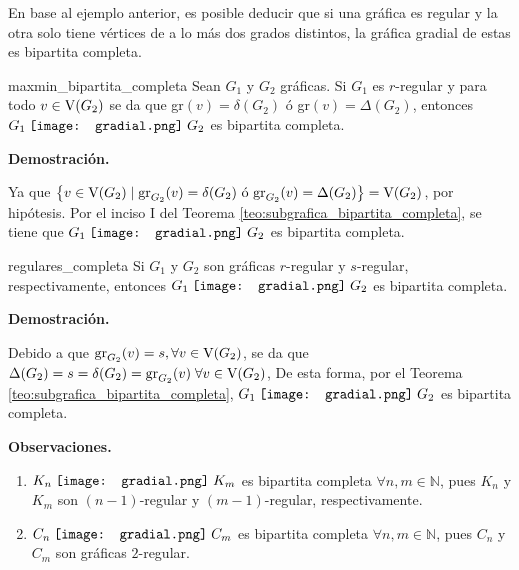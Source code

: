 \documentclass[fleqn, 11pt]{beamer}
\newcommand{\gradial}{\hspace{0.9mm} \texttt{[image: gradial.png]} \hspace{1mm}}
\begin{document}
    En base al ejemplo anterior, es posible deducir que si una gráfica es regular y la otra solo tiene vértices de a lo más dos grados distintos, la gráfica gradial de estas es bipartita completa.

    \begin{corolario}[beforeafter skip = 4mm]{}{maxmin_bipartita_completa}
        Sean $ G_1 $ y $ G_2 $ gráficas. Si $ G_1 $ es $ r $-regular y para todo $ v \in \textnormal{V}(G_2) $ se da que gr$(v) = \delta(G_2) $ ó gr$(v) = \Delta(G_2) $, entonces $ G_1 \gradial G_2 $ es bipartita completa.

        \tcblower

        \textbf{Demostración.} \vspace{3mm}

        Ya que $ \bigl\{ v \in \textnormal{V}(G_2) \mid \textnormal{gr}_{G_2}(v) = \delta(G_2) \textnormal{ ó gr}_{G_2}(v) = \Delta(G_2) \bigr\} = \textnormal{V}(G_2) $, por hipótesis. Por el inciso \textsc{I} del Teorema \eqref{teo:subgrafica_bipartita_completa}, se tiene que $ G_1 \gradial G_2 $ es bipartita completa.
    \end{corolario}

    \begin{corolario}[beforeafter skip = 4mm]{}{regulares_completa}
        Si $ G_1 $ y $ G_2 $ son gráficas $ r $-regular y $ s $-regular, respectivamente, entonces $ G_1 \gradial G_2 $ es bipartita completa.

        \tcblower

        \textbf{Demostración.} \vspace{3mm}

        Debido a que $ \textnormal{gr}_{G_2}(v) = s, \forall v \in \textnormal{V}(G_2) $, se da que $ \Delta(G_2) = s = \delta(G_2) = \textnormal{gr}_{G_2}(v) \; \forall v \in \textnormal{V}(G_2) $, De esta forma, por el Teorema \eqref{teo:subgrafica_bipartita_completa}, $ G_1 \gradial G_2 $ es bipartita completa.
    \end{corolario}

    \textbf{Observaciones.}

    \begin{enumerate}
        \item $ K_n \gradial K_m $ es bipartita completa $ \forall n, m \in \mathbb{N} $, pues $ K_n $ y $ K_m $ son $ (n-1) $-regular y $ (m-1) $-regular, respectivamente.
        \item $ C_n \gradial C_m $ es bipartita completa $ \forall n, m \in \mathbb{N} $, pues $ C_n $ y $ C_m $ son gráficas $ 2 $-regular.
    \end{enumerate} \vspace{1mm}
\end{document}
